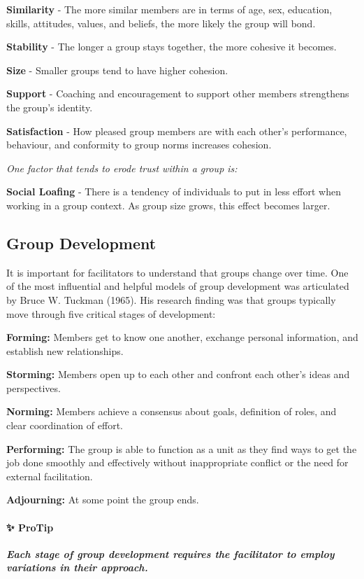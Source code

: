 \documentclass[
]{book}
\begin{document}
\textbf{Similarity} - The more similar members are in terms of age, sex, education, skills, attitudes, values, and beliefs, the more likely the group will bond.

\textbf{Stability} - The longer a group stays together, the more cohesive it becomes.

\textbf{Size} - Smaller groups tend to have higher cohesion.

\textbf{Support} - Coaching and encouragement to support other members strengthens the group's identity.

\textbf{Satisfaction} - How pleased group members are with each other's performance, behaviour, and conformity to group norms increases cohesion.

\emph{One factor that tends to erode trust within a group is:}

\textbf{Social Loafing} - There is a tendency of individuals to put in less effort when working in a group context. As group size grows, this effect becomes larger.

\hypertarget{group-development}{%
\subsection*{Group Development}\label{group-development}}

It is important for facilitators to understand that groups change over time. One of the most influential and helpful models of group development was articulated by Bruce W. Tuckman (1965). His research finding was that groups typically move through five critical stages of development:

\textbf{Forming:} Members get to know one another, exchange personal information, and establish new relationships.

\textbf{Storming:} Members open up to each other and confront each other's ideas and perspectives.

\textbf{Norming:} Members achieve a consensus about goals, definition of roles, and clear coordination of effort.

\textbf{Performing:} The group is able to function as a unit as they find ways to get the job done smoothly and effectively without inappropriate conflict or the need for external facilitation.

\textbf{Adjourning:} At some point the group ends.

\begin{protip}
\hypertarget{protip}{%
\paragraph*{✨ ProTip}\label{protip}}

\textbf{\emph{Each stage of group development requires the facilitator
to employ variations in their approach.}}
\end{protip}
\end{document}

